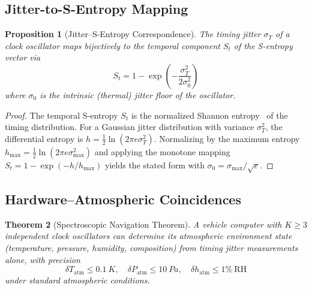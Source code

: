 \documentclass[twocolumn,10pt]{article}
\newtheorem{theorem}{Theorem}[section]
\newtheorem{proposition}[theorem]{Proposition}
\theoremstyle{definition}
\theoremstyle{remark}
\begin{document}
\subsection{Jitter-to-S-Entropy Mapping}

\begin{proposition}[Jitter--S-Entropy Correspondence]\label{prop:jitter-sentropy}
The timing jitter $\sigma_T$ of a clock oscillator maps bijectively to the
temporal component $S_t$ of the S-entropy vector via
\begin{equation}\label{eq:jitter-sentropy}
  S_t = 1 - \exp\!\left(-\frac{\sigma_T^2}{2\sigma_0^2}\right)
\end{equation}
where $\sigma_0$ is the intrinsic (thermal) jitter floor of the oscillator.
\end{proposition}

\begin{proof}
The temporal S-entropy $S_t$ is the normalized Shannon
entropy~\cite{shannon1948} of the timing distribution. For a Gaussian
jitter distribution with variance $\sigma_T^2$, the differential entropy
is $h = \frac{1}{2}\ln(2\pi e \sigma_T^2)$. Normalizing by the maximum
entropy $h_{\max} = \frac{1}{2}\ln(2\pi e \sigma_{\max}^2)$ and applying
the monotone mapping $S_t = 1 - \exp(-h/h_{\max})$ yields the stated
form with $\sigma_0 = \sigma_{\max}/\sqrt{e}$.
\end{proof}

\subsection{Hardware--Atmospheric Coincidences}

\begin{theorem}[Spectroscopic Navigation Theorem]\label{thm:spec-nav}
A vehicle computer with $K \geq 3$ independent clock oscillators can
determine its atmospheric environment state (temperature, pressure, humidity,
composition) from timing jitter measurements alone, with precision
\begin{equation}\label{eq:spec-nav-precision}
  \delta T_{\mathrm{atm}} \leq \SI{0.1}{K}, \quad
  \delta P_{\mathrm{atm}} \leq \SI{10}{Pa}, \quad
  \delta h_{\mathrm{atm}} \leq 1\%~\mathrm{RH}
\end{equation}
under standard atmospheric conditions.
\end{theorem}
\end{document}
